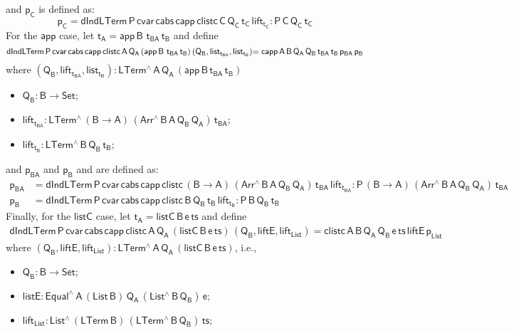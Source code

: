 \documentclass[9pt]{entcs} \usepackage{entcsmacro}
\begin{document}
and $\mathsf{p_C}$ is defined as:
\[
  \mathsf{p_C =  dIndLTerm\,P\,cvar\,cabs \,capp \,clistc\, C\, Q_C\, t_C\, lift_{t_C}  : P \, C\, Q_C \, t_C }
\]
For the $\mathsf{app}$ case, let $\mathsf{t_A = app \,B \,\,t_{BA} \, t_B} $ and define
\[
  \mathsf{dIndLTerm \, P\, cvar \, cabs\, capp\, clistc \, A\, Q_A\,  (app \,B \,\,t_{BA} \, t_B)\, (Q_B , list_{t_{BA}}, list_{t_B})} \\
  \mathsf{= capp\,A\,B\,Q_A\, Q_B\, t_{BA}\, t_B\, p_{BA} \, p_B}
\]
where $\mathsf{(Q_B , lift_{t_{BA}}, list_{t_B}) : LTerm^{\wedge}\, A\, Q_A\, (app \,B \,t_{BA} \, t_B)}$
\begin{itemize}
  \item $\mathsf{Q_B : B \to Set}$;
  \item $\mathsf{lift_{t_{BA}}: LTerm^{\wedge} \, (B \to A)\, (Arr^{\wedge} \, B\, A\, Q_B \, Q_A)\, t_{BA}}$;
  \item $\mathsf{lift_{t_B}: LTerm^{\wedge} \, B\, Q_B\, t_B}$;
\end{itemize}
and $\mathsf{p_{BA}}$ and $\mathsf{p_B}$
and are defined as:
\begin{align*}
  \mathsf{p_{BA}} &= \mathsf{dIndLTerm\,P\,cvar\,cabs \,capp \,clistc\, (B \to A)\,(Arr^{\wedge} \, B\, A\, Q_B \, Q_A) \, t_{BA}\, lift_{t_{BA}}
  : P \, (B \to A)\, (Arr^{\wedge} \, B\, A\, Q_B \, Q_A) \, t_{BA} } \\
  \mathsf{p_B} &= \mathsf{dIndLTerm\,P\,cvar\,cabs \,capp \,clistc\, B\, Q_B\, t_B\, lift_{t_B}  : P \, B\, Q_B \, t_B } 
\end{align*}
Finally, for the $\mathsf{listC}$ case, let $\mathsf{t_A = listC \,B \,e \, ts}$ and define
\begin{multline*}
  \mathsf{dIndLTerm \, P\, cvar \, cabs\, capp\, clistc \, A\, Q_A\, (listC \,B \,e \, ts) \, (Q_B , liftE, lift_{List})
  = clistc \,A\,B\,Q_A\, Q_B\, e\, ts\, liftE\, p_{List} }
\end{multline*}
where $\mathsf{(Q_B , liftE, lift_{List}): LTerm^{\wedge}\, A\, Q_A\, (listC \,B \,e \, ts)}$, i.e.,
\begin{itemize}
  \item $\mathsf{Q_B : B \to Set}$;
  \item $\mathsf{listE : Equal^{\wedge}\, A\, (List\,B)\, Q_A\, (List^{\wedge}\, B\, Q_B)\, e}$;
  \item $\mathsf{lift_{List}: List^{\wedge} \, (LTerm\, B) \, (LTerm^{\wedge}\, B\, Q_B) \, ts}$;
\end{itemize}
\end{document}
